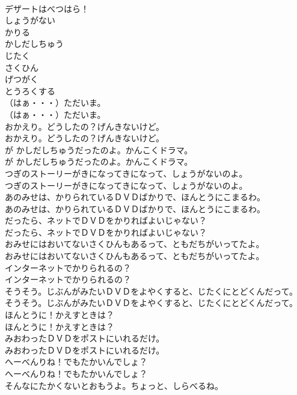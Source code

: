 \documentclass[8pt]{extreport}
\begin{document}
\begin{CJK}{UTF8}{min}
\\	デザートはべつはら！
\\	しょうがない
\\	かりる
\\	かしだしちゅう
\\	じたく
\\	さくひん
\\	げつがく
\\	とうろくする
\\	（はぁ・・・）ただいま。
\\	（はぁ・・・）ただいま。
\\	おかえり。どうしたの？げんきないけど。
\\	おかえり。どうしたの？げんきないけど。
\\	が かしだしちゅうだったのよ。かんこくドラマ。
\\	が かしだしちゅうだったのよ。かんこくドラマ。
\\	つぎのストーリーがきになってきになって、しょうがないのよ。
\\	つぎのストーリーがきになってきになって、しょうがないのよ。
\\	あのみせは、かりられているＤＶＤばかりで、ほんとうにこまるわ。
\\	あのみせは、かりられているＤＶＤばかりで、ほんとうにこまるわ。
\\	だったら、ネットでＤＶＤをかりればよいじゃない？
\\	だったら、ネットでＤＶＤをかりればよいじゃない？
\\	おみせにはおいてないさくひんもあるって、ともだちがいってたよ。
\\	おみせにはおいてないさくひんもあるって、ともだちがいってたよ。
\\	インターネットでかりられるの？
\\	インターネットでかりられるの？
\\	そうそう。じぶんがみたいＤＶＤをよやくすると、じたくにとどくんだって。
\\	そうそう。じぶんがみたいＤＶＤをよやくすると、じたくにとどくんだって。
\\	ほんとうに！かえすときは？
\\	ほんとうに！かえすときは？
\\	みおわったＤＶＤをポストにいれるだけ。
\\	みおわったＤＶＤをポストにいれるだけ。
\\	へーべんりね！でもたかいんでしょ？
\\	へーべんりね！でもたかいんでしょ？
\\	そんなにたかくないとおもうよ。ちょっと、しらべるね。

\end{CJK}
\end{document}
